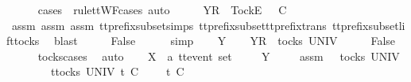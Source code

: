 \begin{isabellebody}
\ \ \ \ \isamarkupfalse%
\ {\isacharparenleft}cases\ {\isasymrho}{\isacharprime}{\isacharprime}\ rule{\isacharcolon}ttWF{\isachardot}cases{\isacharcomma}\ auto{\isacharparenright}\isanewline
\ \ \isamarkupfalse%
\ \isamarkupfalse%
\ {\isachardoublequoteopen}{\isacharbrackleft}Y{\isacharbrackright}\isactrlsub R\ {\isacharhash}\ {\isacharbrackleft}Tock{\isacharbrackright}\isactrlsub E\ {\isacharhash}\ {\isasymrho}{\isacharprime}{\isacharprime}{\isacharprime}\ {\isasymle}\isactrlsub C\ {\isacharbrackleft}{\isacharbrackright}{\isachardoublequoteclose}\isanewline
\ \ \ \ \isamarkupfalse%
\ assm{}{\isacharprime}\ assm{}\ assm{}\ tt{\isacharunderscore}prefix{\isacharunderscore}subset{\isachardot}simps{\isacharparenleft}{}{\isacharparenright}\ tt{\isacharunderscore}prefix{\isacharunderscore}subset{\isacharunderscore}tt{\isacharunderscore}prefix{\isacharunderscore}trans\ tt{\isacharunderscore}prefix{\isacharunderscore}subset{\isacharunderscore}lift{\isacharunderscore}tocks\ \isamarkupfalse%
\ blast\isanewline
\ \ \isamarkupfalse%
\ \isamarkupfalse%
\ {\isachardoublequoteopen}False{\isachardoublequoteclose}\isanewline
\ \ \ \ \isamarkupfalse%
\ simp\isanewline
{}\isamarkupfalse%
\isanewline
\ \ \isamarkupfalse%
\ Y\isanewline
\ \ \isamarkupfalse%
\ {\isachardoublequoteopen}{\isacharbrackleft}{\isacharbrackleft}Y{\isacharbrackright}\isactrlsub R{\isacharbrackright}\ {\isasymin}\ tocks\ UNIV{\isachardoublequoteclose}\isanewline
\ \ \isamarkupfalse%
\ \isamarkupfalse%
\ {\isachardoublequoteopen}False{\isachardoublequoteclose}\isanewline
\ \ \ \ \isamarkupfalse%
\ tocks{\isachardot}cases\ \isamarkupfalse%
\ auto\isanewline
{}\isamarkupfalse%
\isanewline
\ \ \isamarkupfalse%
\ X\ {\isacharcolon}{\isacharcolon}\ {\isachardoublequoteopen}{\isacharprime}a\ ttevent\ set{\isachardoublequoteclose}\isanewline
\ \ \isamarkupfalse%
\ {\isasymrho}\ Y\ {\isasymsigma}{\isacharprime}{\isacharprime}\isanewline
\ \ \isamarkupfalse%
\ assm{}{\isacharcolon}\ {\isachardoublequoteopen}{\isacharparenleft}{\isasymsigma}{\isacharprime}{\isacharprime}\ {\isasymin}\ tocks\ UNIV\ {\isasymLongrightarrow}\isanewline
\ \ \ \ \ \ \ \ {\isasymforall}t{\isasymin}tocks\ UNIV{\isachardot}\ t\ {\isasymle}\isactrlsub C\ {\isasymsigma}{\isacharprime}{\isacharprime}\ {\isacharat}\ {\isasymsigma}\ {\isasymlongrightarrow}\ t\ {\isasymle}\isactrlsub C\ {\isasymsigma}{\isacharprime}{\isacharprime}\ {\isasymLongrightarrow}\isanewline

\end{isabellebody}
